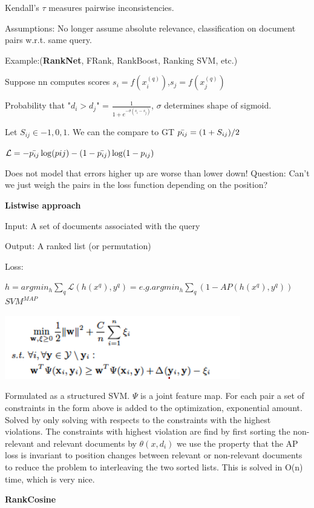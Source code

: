 \documentclass[a4paper,10pt,landscape]{article}
\begin{document}
\begin{multicols}{3}
Kendall's $\tau$ measures pairwise inconsistencies.

Assumptions: No longer assume absolute relevance, classification on document pairs w.r.t. same query.

Example:(\textbf{RankNet}, FRank, RankBoost, Ranking SVM, etc.)

Suppose nn computes scores $s_i = f(x_i^{(q)})$,$s_j = f(x_j^{(q)})$

Probability that "$d_i > d_j$" = $\frac{1}{1+e^{-\sigma(s_i-s_j)}}$, $\sigma$ determines shape of sigmoid.


Let $S_{ij} \in {-1,0,1}$. We can the compare to GT $\Bar{p_{ij}}= (1+S_{ij})/2$

$\mathcal{L} = -\Bar{p_{ij}}\log(p{ij})-(1-\Bar{p_{ij}})\log(1-p_{ij})$

Does not model that errors higher up are worse than lower down! Question: Can't we just weigh the pairs in the loss function depending on the position?

\textbf{Listwise approach}

Input: A set of documents associated with the query

Output: A ranked list (or permutation)

Loss:

$h = argmin_h \sum_q \mathcal{L}(h(x^q),y^q) = e.g. argmin_h \sum_q(1-AP(h(x^q),y^q))$
$SVM^{MAP}$

\includegraphics[width=\linewidth]{images/svmmap.png}

Formulated as a structured SVM. $\Psi$ is a joint feature map. For each pair a set of constraints in the form above is added to the optimization, exponential amount. Solved by only solving with respects to the constraints with the highest violations. The constraints with highest violation are find by first sorting the non-relevant and relevant documents by $\theta(x,d_i)$ we use the property that the AP loss is invariant to position changes between relevant or non-relevant documents to reduce the problem to interleaving the two sorted lists. This is solved in O(n) time, which is very nice.

\textbf{RankCosine}


\end{multicols}
\end{document}

